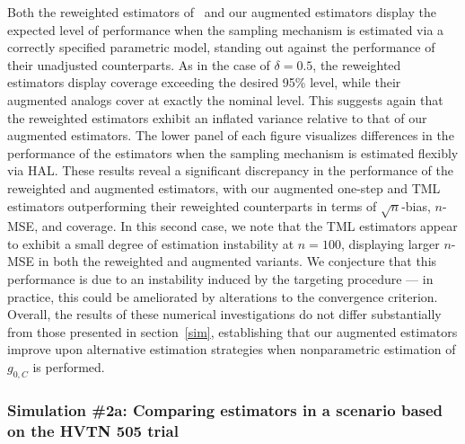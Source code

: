 Both the reweighted estimators of~\citet{rose2011targeted2sd} and our augmented
estimators display the expected level of performance when the sampling mechanism
is estimated via a correctly specified parametric model, standing out against
the performance of their unadjusted counterparts. As in the case of $\delta
= 0.5$, the reweighted estimators display coverage exceeding the desired 95\%
level, while their augmented analogs cover at exactly the nominal level. This
suggests again that the reweighted estimators exhibit an inflated variance
relative to that of our augmented estimators. The lower panel of each figure
visualizes differences in the performance of the estimators when the sampling
mechanism is estimated flexibly via HAL. These results reveal a significant
discrepancy in the performance of the reweighted and augmented estimators, with
our augmented one-step and TML estimators outperforming their reweighted
counterparts in terms of $\sqrt{n}$-bias, $n$-MSE, and coverage. In this second
case, we note that the TML estimators appear to exhibit a small degree of
estimation instability at $n = 100$, displaying larger $n$-MSE in both the
reweighted and augmented variants. We conjecture that this performance is due to
an instability induced by the targeting procedure --- in practice, this could be
ameliorated by alterations to the convergence criterion. Overall, the results of
these numerical investigations do not differ substantially from those presented
in section~\ref{sim}, establishing that our augmented estimators improve
upon alternative estimation strategies when nonparametric estimation of
$g_{0,C}$ is performed.

\subsubsection{Simulation \#2a: Comparing estimators in a scenario based on
  the HVTN 505 trial}\label{hvtn_sim}


